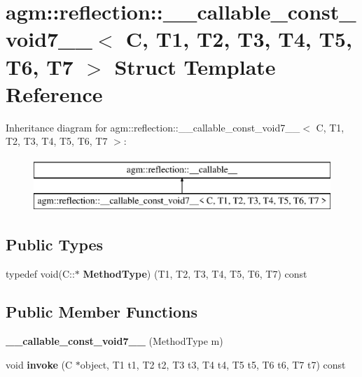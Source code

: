 \hypertarget{structagm_1_1reflection_1_1____callable__const__void7____}{}\section{agm\+:\+:reflection\+:\+:\+\_\+\+\_\+callable\+\_\+const\+\_\+void7\+\_\+\+\_\+$<$ C, T1, T2, T3, T4, T5, T6, T7 $>$ Struct Template Reference}
\label{structagm_1_1reflection_1_1____callable__const__void7____}
Inheritance diagram for agm\+:\+:reflection\+:\+:\+\_\+\+\_\+callable\+\_\+const\+\_\+void7\+\_\+\+\_\+$<$ C, T1, T2, T3, T4, T5, T6, T7 $>$\+:\begin{figure}[H]
\begin{center}
\leavevmode
\includegraphics[height=2.000000cm]{structagm_1_1reflection_1_1____callable__const__void7____}
\end{center}
\end{figure}
\subsection*{Public Types}
\begin{DoxyCompactItemize}
\item 
typedef void(C\+::$\ast$ {\bfseries Method\+Type}) (T1, T2, T3, T4, T5, T6, T7) const \hypertarget{structagm_1_1reflection_1_1____callable__const__void7_____a138c2080d179329668787db2a01d748c}{}\label{structagm_1_1reflection_1_1____callable__const__void7_____a138c2080d179329668787db2a01d748c}

\end{DoxyCompactItemize}
\subsection*{Public Member Functions}
\begin{DoxyCompactItemize}
\item 
{\bfseries \+\_\+\+\_\+callable\+\_\+const\+\_\+void7\+\_\+\+\_\+} (Method\+Type m)\hypertarget{structagm_1_1reflection_1_1____callable__const__void7_____a0470d205224801f9f6b9d3efb1884ec6}{}\label{structagm_1_1reflection_1_1____callable__const__void7_____a0470d205224801f9f6b9d3efb1884ec6}

\item 
void {\bfseries invoke} (C $\ast$object, T1 t1, T2 t2, T3 t3, T4 t4, T5 t5, T6 t6, T7 t7) const \hypertarget{structagm_1_1reflection_1_1____callable__const__void7_____a678c4d5a24084f49a9b7a210cd45b4a7}{}\label{structagm_1_1reflection_1_1____callable__const__void7_____a678c4d5a24084f49a9b7a210cd45b4a7}

\end{DoxyCompactItemize}
